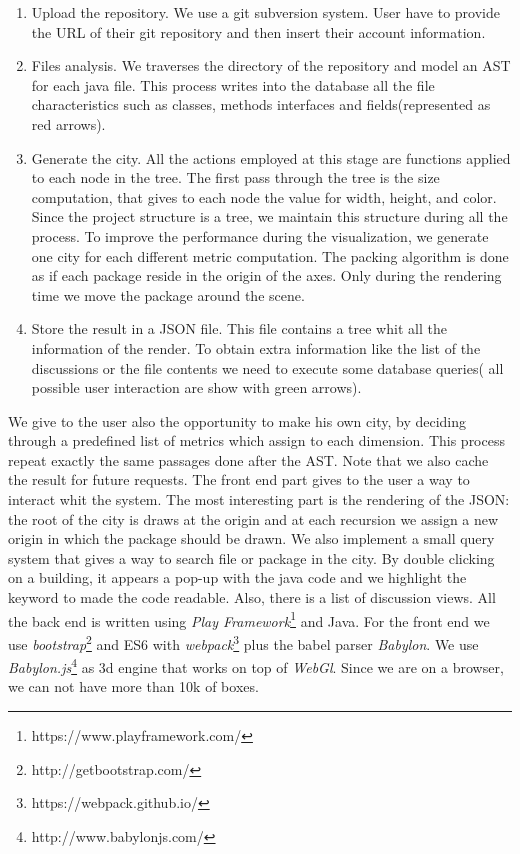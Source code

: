 \documentclass[]{usiinfbachelorproject}
\begin{document}
\begin{enumerate}

\item Upload the repository. We use a git subversion system. User have to provide the URL of their git repository and then insert their account information.

\item Files analysis. We traverses the directory of the repository and model an AST for each java file. This process writes into the database all the file characteristics such as classes, methods interfaces and fields(represented as red arrows).

\item Generate the city. All the actions employed at this stage are functions applied to each node in the tree. The first pass through the tree is the size computation, that gives to each node the value for width, height, and color. Since the project structure is a tree, we maintain this structure during all the process. To improve the performance during the visualization, we generate one city for each different metric computation.
The packing algorithm is done as if each package reside in the origin of the axes. Only during the rendering time we move the package around the scene.
\item Store the result in a JSON file. This file contains a tree whit all the information of the render. To obtain extra information like the list of the discussions or the file contents we need to execute some database queries( all possible user interaction are show with green arrows).

\end{enumerate}

We give to the user also the opportunity to make his own city, by deciding through a predefined list of metrics which assign to each dimension. This process repeat exactly the same passages done after the AST. Note that we also cache the result for future requests. 
The front end part gives to the user a way to interact whit the system. The most interesting part is the rendering of the JSON: the root of the city is draws at the origin and at each recursion we assign a new origin in which the package should be drawn.
We also implement a small query system that gives a way to search file or package in the city. By double clicking on a building, it appears a pop-up with the java code and we highlight the keyword to made the code readable. Also, there is a list of discussion views.
All the back end is written using \textit{Play Framework}\footnote{https://www.playframework.com/} and Java.  For the front end we use \textit{bootstrap}\footnote{http://getbootstrap.com/} and ES6 with \textit{webpack}\footnote{https://webpack.github.io/} plus the babel parser \textit{Babylon}.
We use \textit{Babylon.js}\footnote{http://www.babylonjs.com/} as 3d engine that works on top of \textit{WebGl}. Since we are on a browser, we can not have more than 10k of boxes. 
\end{document}
